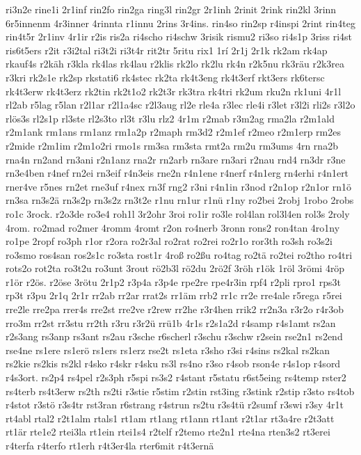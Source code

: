 {ri3n2e
rine1i
2r1inf
rin2fo
rin2ga
ring3l
rin2gr
2r1inh
2rinit
2rink
rin2kl
3rinn
6r5innenm
4r3inner
4rinnta
r1innu
2rins
3r4ins.
rin4so
rin2sp
r4inspi
2rint
rin4teg
rin4t5r
2r1inv
4r1ir
r2is
ris2a
ri4scho
ri4schw
3risik
rismu2
ri3so
ri4s1p
3riss
ri4st
ris6t5ers
r2it
r3i2tal
ri3t2i
ri3t4r
rit2tr
5ritu
rix1
1rí
2r1j
2r1k
rk2am
rk4ap
rkauf4s
r2käh
r3kla
rk4las
rk4lau
r2klis
rk2lo
rk2lu
rk4n
r2k5nu
rk3räu
r2k3rea
r3kri
rk2s1e
rk2sp
rkstati6
rk4stec
rk2ta
rk4t3eng
rk4t3erf
rkt3ers
rk6tersc
rk4t3erw
rk4t3erz
rk2tin
rk2t1o2
rk2t3r
rk3tra
rk4tri
rk2um
rku2n
rk1uni
4r1l
rl2ab
r5lag
r5lan
r2l1ar
r2l1a4sc
r2l3aug
rl2e
rle4a
r3lec
rle4i
r3let
r3l2i
rli2s
r3l2o
rlös3s
rl2s1p
rl3ste
rl2s3to
rl3t
r3lu
rlz2
4r1m
r2mab
r3m2ag
rma2la
r2m1ald
r2m1ank
rm1ans
rm1anz
rm1a2p
r2maph
rm3d2
r2m1ef
r2meo
r2m1erp
rm2es
r2mide
r2m1im
r2m1o2ri
rmo1s
rm3sa
rm3sta
rmt2a
rm2u
rm3ums
4rn
rna2b
rna4n
rn2and
rn3ani
r2n1anz
rna2r
rn2arb
rn3are
rn3ari
r2nau
rnd4
rn3dr
r3ne
rn3e4ben
r4nef
rn2ei
rn3eif
r4n3eis
rne2n
r4n1ene
r4nerf
r4n1erg
rn4erhi
r4n1ert
rner4ve
r5nes
rn2et
rne3uf
r4nex
rn3f
rng2
r3ni
r4n1in
r3nod
r2n1op
r2n1or
rn1ö
rn3sa
rn3s2ä
rn3s2p
rn3s2z
rn3t2e
r1nu
rn1ur
r1nü
r1ny
ro2bei
2robj
1robo
2robs
ro1c
3rock.
r2o3de
ro3e4
roh1l
3r2ohr
3roi
ro1ir
ro3le
rol4lan
rol3l4en
rol3s
2roly
4rom.
ro2mad
ro2mer
4romm
4romt
r2on
ro4nerb
3ronn
rons2
ron4tan
4ro1ny
ro1pe
2ropf
ro3ph
r1or
r2ora
ro2r3al
ro2rat
ro2rei
ro2r1o
ror3th
ro3sh
ro3s2i
ro3smo
ros4san
ros2s1c
ro3sta
rost1r
4roß
ro2ßu
ro4tag
ro2tä
ro2tei
ro2tho
ro4tri
rots2o
rot2ta
ro3t2u
ro3unt
3rout
rö2b3l
rö2du
2rö2f
3röh
r1ök
1röl
3römi
4röp
r1ör
r2ös.
r2öse
3rötu
2r1p2
r3p4a
r3p4e
rpe2re
rpe4r3in
rpf4
r2pli
rpro1
rps3t
rp3t
r3pu
2r1q
2r1r
rr2ab
rr2ar
rrat2s
rr1äm
rrb2
rr1c
rr2e
rre4ale
r5rega
r5rei
rre2le
rre2pa
rrer4s
rre2st
rre2ve
r2rew
rr2he
r3r4hen
rrik2
rr2n3a
r3r2o
r4r3ob
rro3m
rr2st
rr3stu
rr2th
r3ru
r3r2ü
rrü1b
4r1s
r2s1a2d
r4samp
r4s1amt
rs2an
r2s3ang
rs3anp
rs3ant
rs2au
r3sche
r6scherl
r3schu
r3schw
r2sein
rse2n1
rs2end
rse4ne
rs1ere
rs1erö
rs1ers
rs1erz
rse2t
rs1eta
r3sho
r3si
r4sins
rs2kal
rs2kan
rs2kie
rs2kis
rs2kl
r4sko
r4skr
r4sku
rs3l
rs4no
r3so
r4sob
rson4e
r4s1op
r4sord
r4s3ort.
rs2p4
rs4pel
r2s3ph
r5spi
rs3s2
r4stant
r5statu
r6st5eing
rs4temp
rster2
rs4terb
rs4t3erw
rs2th
rs2ti
r3stie
r5stim
r2stin
rst3ing
r3stink
r2stip
r3sto
rs4tob
r4stot
r3stö
r3s4tr
rst3ran
r6strang
r4strun
rs2tu
r3s4tü
r2sumf
r3swi
r3sy
4r1t
rt4abl
rtal2
r2t1alm
rtals1
rt1am
rt1ang
rt1ann
rt1ant
r2t1ar
rt3a4re
r2t3att
rt1är
rte1e2
rtei3la
rt1ein
rtei1s4
r2telf
r2temo
rte2n1
rte4na
rten3s2
rt3erei
r4terfa
r4terfo
rt1erh
r4t3er4la
rter6mit
r4t3ernä
}
